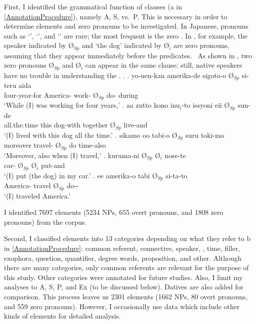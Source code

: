 First,
I identified the grammatical function of clauses (a in \ref{AnnotationProcedure}),
namely A, S, vs.~P.
This is necessary in order to determine  elements and zero pronouns to be investigated.
In Japanese,
pronouns such as  `',  `', and  `' are rare;
the most frequent  is the zero .
In \Next,
for example, the speaker indicated by {\O$_{Sp}$} and `the dog' indicated by {\O$_{i}$} are zero pronouns,
assuming that they appear immediately before the predicates.%
	\
As shown in \Next[d],
two zero pronouns {\O$_{Sp}$} and {\O$_{i}$} can appear in the same clause;
still, native speakers have no trouble in understanding the \isi{utterance}.
\ex. \ag. yo-nen-kan amerika-de sigoto-o {\O$_{Sp}$} si-teru aida \\
			four-year-for America- work- {\O$_{Sp}$} do- during \\
			`While (I) was working for four years,'
	\bg. aa zutto kono inu$_{i}$-to issyoni eii {\O$_{Sp}$} sun-de \\
		 all.the.time this dog-with together \ab{fl} {\O$_{Sp}$} live-and \\
		`(I) lived with this dog all the time.'
	\bg. sikamo oo tabi-o {\O$_{Sp}$} suru toki-mo \\
		moreover  travel- {\O$_{Sp}$} do time-also \\
		`Moreover, also when (I) travel,'
	\bg. kuruma-ni {\O$_{Sp}$} {\O$_{i}$} nose-te \\
		car- {\O$_{Sp}$} {\O$_{i}$} put-and \\
		`(I) put (the dog) in my car.'
	\bg. ee amerika-o tabi {\O$_{Sp}$} si-ta-to \\
		 America- travel {\O$_{Sp}$} do-- \\
		`(I) traveled America.'
		\hfill{}

I identified 7697  elements (5234 NPs, 655 overt pronouns, and 1808 zero pronouns) from the corpus.

Second, I classified  elements into 13 categories depending on what they refer to b in \ref{AnnotationProcedure}:
common referent, connective, speaker, \isi{hearer}, time, filler, exophora, question, quantifier, degree words, proposition, and other.
Although there are many categories,
only common referents are relevant for the purpose of this study.
Other categories were annotated for future studies.
Also, I limit my analyses to A, S, P, and Ex (to be discussed below).
Datives are also added for comparison.
This process leaves us
2301 elements (1662 NPs, 80 overt pronouns, and 559 zero pronouns).
However, I occasionally use data which include other kinds of elements
for detailed analysis.

